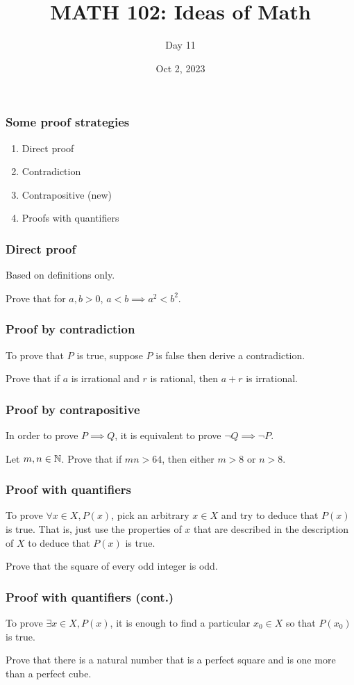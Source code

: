 \documentclass[aspectratio=169]{beamer}
\title{MATH 102: Ideas of Math}
\author{Day 11}
\date{Oct 2, 2023}
\begin{document}
\frame{\titlepage}

\begin{frame}
    \frametitle{ Some proof strategies }
    \begin{enumerate}
        \item Direct proof
        \item Contradiction
        \item Contrapositive (new)
        \item Proofs with quantifiers
    \end{enumerate}
\end{frame}

\begin{frame}
    \frametitle{ Direct proof }
    Based on definitions only.
    \begin{example}
        Prove that for $a,b>0$,  $a<b \implies a^2 < b^2$.
    \end{example}
\end{frame}

\begin{frame}
    \frametitle{ Proof by contradiction }
    To prove that $P$ is true, suppose $P$ is false then derive a contradiction.
    \begin{example}
        Prove that if $a$ is irrational and $r$ is rational, then $a+r$ is irrational.
    \end{example}
\end{frame}

\begin{frame}
    \frametitle{ Proof by contrapositive}
    In order to prove $P\implies Q$, it is equivalent to prove $\neg Q \implies \neg P$.
    \begin{example}
        Let $m,n \in \mathbb{N}$. Prove that if $mn > 64$, then either $m>8$ or $n>8$.
    \end{example}
\end{frame}

\begin{frame}
    \frametitle{Proof with quantifiers}
    To prove $\forall x \in X, P(x)$, pick an arbitrary $x \in X$ and try to 
    deduce that $P(x)$ is true.
    That is, just use the properties of $x$ that are described in the description of $X$ to deduce
    that $P(x)$ is true.
    \begin{example}
        Prove that the square of every odd integer is odd.
    \end{example}
\end{frame}

\begin{frame}
    \frametitle{Proof with quantifiers (cont.)}
    To prove  $\exists x\in X, P(x)$, it is enough to find a particular $x_0\in X$
    so that $P(x_0)$ is true.
    \begin{example}
        Prove that there is a natural number that is a perfect square and is one more than a
perfect cube.
    \end{example}

\end{frame}
\end{document}
